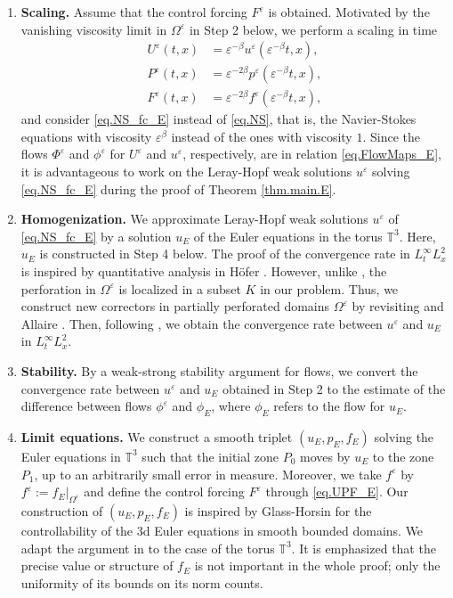 \documentclass[11pt,a4paper]{article}
\numberwithin{equation}{section}
\newcommand{\T}{\mathbb{T}}
\newcommand{\eps}{\varepsilon}
\begin{document}
\begin{enumerate}[Step 1.]
\item
\textbf{Scaling.} 
Assume that the control forcing $F^\eps$ is obtained. Motivated by the vanishing viscosity limit in $\Omega^\eps$ in Step 2 below, we perform a scaling in time 
\begin{equation}\label{eq.UPF_E}
\begin{split}
    U^\eps(t,x) &= \eps^{-\beta} u^\eps(\eps^{-\beta} t,x), \\
    P^\eps(t,x) &= \eps^{-2\beta} p^\eps(\eps^{-\beta} t,x), \\
    F^\eps(t,x) &= \eps^{-2\beta} f^{\eps}(\eps^{-\beta} t,x), 
\end{split}
\end{equation}
and consider \eqref{eq.NS_fc_E} instead of \eqref{eq.NS}, that is, the Navier-Stokes equations with viscosity $\eps^\beta$ instead of the ones with viscosity $1$. Since the flows $\Phi^\eps$ and $\phi^\eps$ for $U^\eps$ and $u^\eps$, respectively, are in relation \eqref{eq.FlowMaps_E}, it is advantageous to work on the Leray-Hopf weak solutions $u^\eps$ solving \eqref{eq.NS_fc_E} during the proof of Theorem \ref{thm.main.E}. 


\item
\textbf{Homogenization.} 
We approximate Leray-Hopf weak solutions $u^\eps$ of \eqref{eq.NS_fc_E} by a solution $u_E$ of the Euler equations in the torus $\T^3$. Here, $u_E$ is constructed in Step 4 below. The proof of the convergence rate in $L^\infty_t L^2_x$ is inspired by quantitative analysis in H\"{o}fer \cite{Hof23}. However, unlike \cite{Hof23}, the perforation in $\Omega^\eps$ is localized in a subset $K$ in our problem. Thus, we construct new correctors in partially perforated domains $\Omega^\eps$ by revisiting \cite{Hof23} and Allaire \cite{All90a,All90b}. Then, following \cite[Proof of Theorem 1.2]{Hof23}, we obtain the convergence rate between $u^\eps$ and $u_E$ in $L^\infty_t L^2_x$. 


\item 
\textbf{Stability.} 
By a weak-strong stability argument for flows, we convert the convergence rate between $u^\eps$ and $u_E$ obtained in Step 2 to the estimate of the difference between flows $\phi^\eps$ and $\phi_E$, where $\phi_E$ refers to the flow for $u_E$. 


\item
\textbf{Limit equations.} 
We construct a smooth triplet $(u_E, p_E, f_E)$ solving the Euler equations in $\T^3$ such that the initial zone $P_0$ moves by $u_E$ to the zone $P_1$, up to an arbitrarily small error in measure. Moreover, we take $f^{\eps}$ by $f^{\eps} := f_E|_{\Omega^\eps}$ and define the control forcing $F^\eps$ through \eqref{eq.UPF_E}. Our construction of $(u_E, p_E, f_E)$ is inspired by Glass-Horsin \cite{GlaHor12} for the controllability of the 3d Euler equations in smooth bounded domains. We adapt the argument in \cite{GlaHor12} to the case of the torus $\T^3$. It is emphasized that the precise value or structure of $f_E$ is not important in the whole proof; only the uniformity of its bounds on its norm counts.
\end{enumerate}
\end{document}
